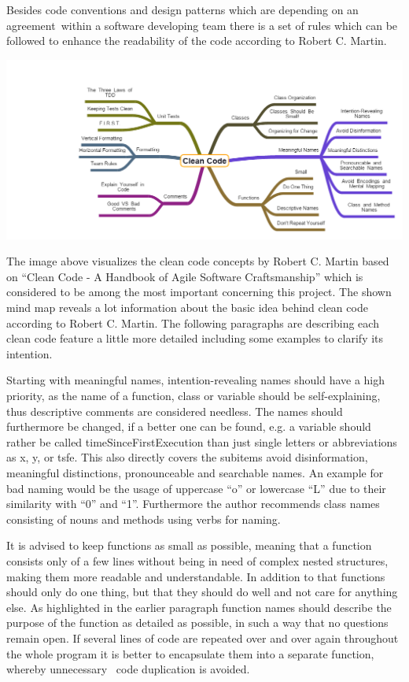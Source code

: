 {Besides code conventions and design patterns which are depending on an
agreement}{~within a software developing team there is a set of rules
whic}{h can be followed to enhance the readability of the code according
to Robert C. Martin.}

{\includegraphics{images/image09.png}}

{The image above visualizes the clean code concepts by Robert C. Martin
based on ``Clean Code - A Handbook of Agile Software Craftsmanship''
which is considered to be among the most important concerning this
project. The shown mind map reveals a lot information about the basic
idea behind clean code according to Robert C. Martin. The following
paragraphs are describing each clean code feature a little more detailed
including some examples to clarify its intention.}

{Starting with }{meaningful names}{, intention-revealing names should
have a high priority, as the name of a function, class or variable
should be self-explaining, thus descriptive comments are considered
needless. The names should furthermore be changed, if a better one can
be found, e.g. a variable should rather be called
timeSinceFirstExecution than just single letters or abbreviations as x,
y, or tsfe. This also directly covers the subitems }{avoid
disinformation, meaningful distinctions, pronounceable and searchable
names}{. An example for bad naming would be the usage of uppercase ``o''
or lowercase ``L'' due to their similarity with ``0'' and ``1''.
Furthermore the author recommends class names consisting of nouns and
methods using verbs for naming.}

{It is advised to keep functions as small as possible, meaning that a
function consists only of a few lines without being in need of complex
nested structures, making them more readable and understandable. In
addition to that functions should only do one thing, but that they
should do well and not care for anything else. As highlighted in the
earlier paragraph function names should describe the purpose of the
function as detailed as possible, in such a way that no questions remain
open. If several lines of code are repeated over and over again
throughout the whole program it is better to encapsulate them into a
separate function, whereby unnecessary ~code duplication is avoided.}

